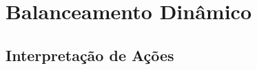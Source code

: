 
\chapter{Balanceamento Dinâmico}
\label{cap:balanceamento dinamico}
\section{Interpretação de Ações}

